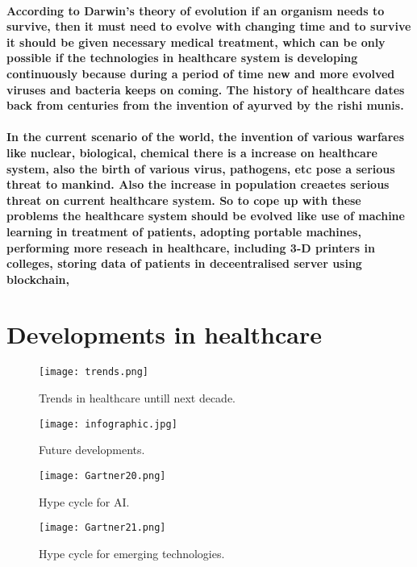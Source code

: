 \documentclass[12pt]{article}
\begin{document}
    \paragraph{According to Darwin's theory of evolution if an organism needs to survive, then it must need to evolve with changing time and to survive it should be given necessary medical treatment, which can be only possible if the technologies in healthcare system is developing continuously because during a period of time new and more evolved viruses and bacteria keeps on coming. The history of healthcare dates back from centuries from the invention of ayurved by the \textbf{rishi munis}.
    \\\\In the current scenario of the world, the invention of various warfares like nuclear, biological, chemical there is a increase on healthcare system, also the birth of various virus, pathogens, etc pose a serious threat to mankind. Also the increase in population creaetes serious threat on current healthcare system. So to cope up with these problems the healthcare system should be evolved like use of machine learning in treatment of patients, adopting portable machines, performing more reseach in healthcare, including 3-D printers in colleges, storing data of patients in deceentralised server using blockchain, }


    
    \section{\textbf{Developments in healthcare}}
    \begin{figure}[h]
    	\texttt{[image: trends.png]}
    	\caption{Trends in healthcare untill next decade.}
    	\texttt{[image: infographic.jpg]}
    	\caption{Future developments.}
    \end{figure}
    \begin{figure}[h]
    
    	\texttt{[image: Gartner20.png]}
    	\caption{Hype cycle for AI.}
    \end{figure}
    \begin{figure}[h]
    	\texttt{[image: Gartner21.png]}
    	\caption{Hype cycle for emerging technologies.}
    \end{figure}
\end{document}
